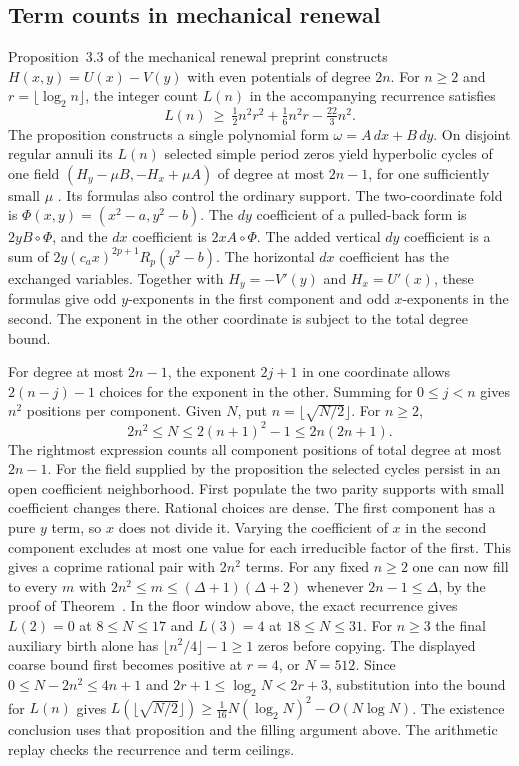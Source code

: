 \subsection{Term counts in mechanical renewal}\label{sup:mechanical-budget}
Proposition~3.3 of the mechanical renewal preprint \cite[pp.~6--10]{LuMechanical} constructs \(H(x,y)=U(x)-V(y)\) with even potentials of degree \(2n\). For \(n\ge2\) and \(r=\lfloor\log_2 n\rfloor\), the integer count \(L(n)\) in the accompanying recurrence satisfies
\[
 L(n)\ \ge\ \tfrac12 n^2r^2+\tfrac16 n^2r-\tfrac{22}{3}n^2.
\]
The proposition constructs a single polynomial form \(\omega=A\,dx+B\,dy\). On disjoint regular annuli its \(L(n)\) selected simple period zeros yield hyperbolic cycles of one field \((H_y-\mu B,-H_x+\mu A)\) of degree at most \(2n-1\), for one sufficiently small \(\mu\) \cite[Proposition~3.3 and (3.7)--(3.10)]{LuMechanical}. Its formulas also control the ordinary support. The two-coordinate fold is \(\Phi(x,y)=(x^2-a,y^2-b)\). The \(dy\) coefficient of a pulled-back form is \(2yB\circ\Phi\), and the \(dx\) coefficient is \(2xA\circ\Phi\). The added vertical \(dy\) coefficient is a sum of \(2y(c_a x)^{2p+1}R_p(y^2-b)\). The horizontal \(dx\) coefficient has the exchanged variables. Together with \(H_y=-V'(y)\) and \(H_x=U'(x)\), these formulas give odd \(y\)-exponents in the first component and odd \(x\)-exponents in the second. The exponent in the other coordinate is subject to the total degree bound.

For degree at most \(2n-1\), the exponent \(2j+1\) in one coordinate allows \(2(n-j)-1\) choices for the exponent in the other. Summing for \(0\le j<n\) gives \(n^2\) positions per component. Given \(N\), put \(n=\lfloor\sqrt{N/2}\rfloor\). For \(n\ge2\),
\[
 2n^2\le N\le 2(n+1)^2-1\le 2n(2n+1).
\]
The rightmost expression counts all component positions of total degree at most \(2n-1\). For the field supplied by the proposition the selected cycles persist in an open coefficient neighborhood. First populate the two parity supports with small coefficient changes there. Rational choices are dense. The first component has a pure \(y\) term, so \(x\) does not divide it. Varying the coefficient of \(x\) in the second component excludes at most one value for each irreducible factor of the first. This gives a coprime rational pair with \(2n^2\) terms. For any fixed \(n\ge2\) one can now fill to every \(m\) with \(2n^2\le m\le(\Delta+1)(\Delta+2)\) whenever \(2n-1\le\Delta\), by the proof of Theorem~. In the floor window above, the exact recurrence gives \(L(2)=0\) at \(8\le N\le17\) and \(L(3)=4\) at \(18\le N\le31\). For \(n\ge3\) the final auxiliary birth alone has \(\lfloor n^2/4\rfloor-1\ge1\) zeros before copying. The displayed coarse bound first becomes positive at \(r=4\), or \(N=512\). Since \(0\le N-2n^2\le4n+1\) and \(2r+1\le\log_2 N<2r+3\), substitution into the bound for \(L(n)\) gives \(L(\lfloor\sqrt{N/2}\rfloor)\ge\tfrac1{16}N(\log_2 N)^2-O(N\log N)\). The existence conclusion uses that proposition and the filling argument above. The arithmetic replay checks the recurrence and term ceilings.

